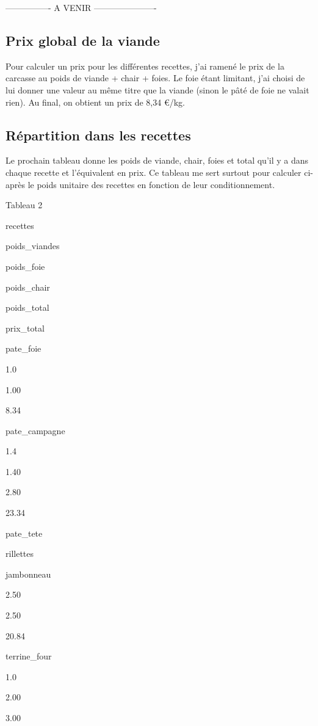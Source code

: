 \documentclass[]{article}
\begin{document}
---------------- A VENIR ----------------------

\hypertarget{prix-global-de-la-viande}{%
\subsection{Prix global de la viande}\label{prix-global-de-la-viande}}

Pour calculer un prix pour les différentes recettes, j'ai ramené le prix
de la carcasse au poids de viande + chair + foies. Le foie étant
limitant, j'ai choisi de lui donner une valeur au même titre que la
viande (sinon le pâté de foie ne valait rien). Au final, on obtient un
prix de 8,34 €/kg.

\hypertarget{repartition-dans-les-recettes}{%
\subsection{Répartition dans les
recettes}\label{repartition-dans-les-recettes}}

Le prochain tableau donne les poids de viande, chair, foies et total
qu'il y a dans chaque recette et l'équivalent en prix. Ce tableau me
sert surtout pour calculer ci-après le poids unitaire des recettes en
fonction de leur conditionnement.

Tableau 2

recettes

poids\_viandes

poids\_foie

poids\_chair

poids\_total

prix\_total

pate\_foie

1.0

1.00

8.34

pate\_campagne

1.4

1.40

2.80

23.34

pate\_tete

rillettes

jambonneau

2.50

2.50

20.84

terrine\_four

1.0

2.00

3.00
\end{document}
